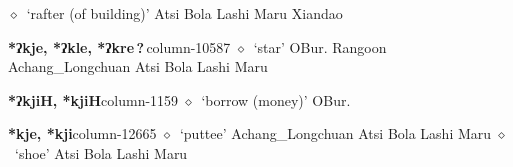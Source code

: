          $\diamond$~`rafter (of building)'
         Atsi 
\hspace{1ex}
         Bola 
\hspace{1ex}
         Lashi 
\hspace{1ex}
         Maru 
\hspace{1ex}
         Xiandao 
  \item {\footnotesize \textbf{*ʔkje, *ʔkle, *ʔkre\,?\,}}{\tiny column-10587}
         $\diamond$~`star'
         OBur. 
\hspace{1ex}
         Rangoon 
\hspace{1ex}
         Achang\_Longchuan 
\hspace{1ex}
         Atsi 
\hspace{1ex}
         Bola 
\hspace{1ex}
         Lashi 
\hspace{1ex}
         Maru 
  \item {\footnotesize \textbf{*ʔkjiH, *kjiH}}{\tiny column-1159}
         $\diamond$~`borrow (money)'
         OBur. 
  \item {\footnotesize \textbf{*kje, *kji}}{\tiny column-12665}
         $\diamond$~`puttee'
         Achang\_Longchuan 
\hspace{1ex}
         Atsi 
\hspace{1ex}
         Bola 
\hspace{1ex}
         Lashi 
\hspace{1ex}
         Maru 
\hspace{1ex}
         $\diamond$~`shoe'
         Atsi 
\hspace{1ex}
         Bola 
\hspace{1ex}
         Lashi 
\hspace{1ex}
         Maru 
